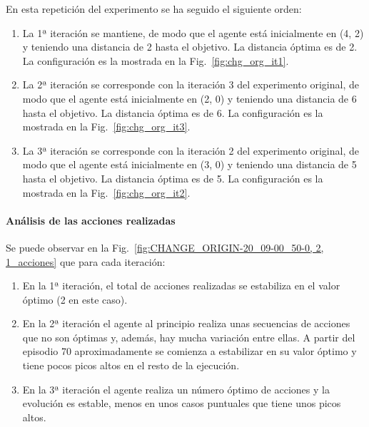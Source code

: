 En esta repetición del experimento se ha seguido el siguiente orden: 
\begin{enumerate}
    \item La 1ª iteración se mantiene,  de modo que el agente está inicialmente en (4, 2) y teniendo una distancia de 2 hasta el objetivo. La distancia óptima es de 2. La configuración es la mostrada en la Fig.~\ref{fig:chg_org_it1}.
    \item La 2ª iteración se corresponde con la iteración 3 del experimento original, de modo que el agente está inicialmente en (2, 0) y teniendo una distancia de 6 hasta el objetivo. La distancia óptima es de 6. La configuración es la mostrada en la Fig.~\ref{fig:chg_org_it3}.
    \item La 3ª iteración se corresponde con la iteración 2 del experimento original, de modo que el agente está inicialmente en (3, 0) y teniendo una distancia de 5 hasta el objetivo. La distancia óptima es de 5. La configuración es la mostrada en la Fig.~\ref{fig:chg_org_it2}.
\end{enumerate}

\paragraph{Análisis de las acciones realizadas}

Se puede observar en la Fig.~\ref{fig:CHANGE_ORIGIN-20_09-00_50-0, 2, 1_acciones} que para cada iteración: 
\begin{enumerate}
    \item En la 1ª iteración, el total de acciones realizadas se estabiliza en el valor óptimo (2 en este caso). 
    \item En la 2ª iteración el agente al principio realiza unas secuencias de acciones que no son óptimas y, además, hay mucha variación entre ellas. A partir del episodio 70 aproximadamente se comienza a estabilizar en su valor óptimo y tiene pocos picos altos en el resto de la ejecución. 
    \item En la 3ª iteración el agente realiza un número óptimo de acciones y la evolución es estable, menos en unos casos puntuales que tiene unos picos altos. 
\end{enumerate}

